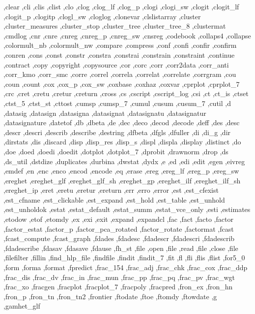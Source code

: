 {{    ,clear ,cli ,clis ,clist ,clo ,clog ,clog_lf ,clog_p ,clogi
    ,clogi_sw ,clogit ,clogit_lf ,clogit_p ,clogitp ,clogl_sw ,cloglog
    ,clonevar ,clslistarray ,cluster ,cluster_measures ,cluster_stop
    ,cluster_tree ,cluster_tree_8 ,clustermat ,cmdlog ,cnr ,cnre
    ,cnreg ,cnreg_p ,cnreg_sw ,cnsreg ,codebook ,collaps4 ,collapse
    ,colormult_nb ,colormult_nw ,compare ,compress ,conf ,confi
    ,confir ,confirm ,conren ,cons ,const ,constr ,constra ,constrai
    ,constrain ,constraint ,continue ,contract ,copy ,copyright
    ,copysource ,cor ,corc ,corr ,corr2data ,corr_anti ,corr_kmo
    ,corr_smc ,corre ,correl ,correla ,correlat ,correlate ,corrgram
    ,cou ,coun ,count ,cox ,cox_p ,cox_sw ,coxbase ,coxhaz ,coxvar
    ,cprplot ,cprplot_7 ,crc ,cret ,cretu ,cretur ,creturn ,cross ,cs
    ,cscript ,cscript_log ,csi ,ct ,ct_is ,ctset ,ctst_5 ,ctst_st
    ,cttost ,cumsp ,cumsp_7 ,cumul ,cusum ,cusum_7 ,cutil ,d ,datasig
    ,datasign ,datasigna ,datasignat ,datasignatu ,datasignatur
    ,datasignature ,datetof ,db ,dbeta ,de ,dec ,deco ,decod ,decode
    ,deff ,des ,desc ,descr ,descri ,describ ,describe ,destring
    ,dfbeta ,dfgls ,dfuller ,di ,di_g ,dir ,dirstats ,dis ,discard
    ,disp ,disp_res ,disp_s ,displ ,displa ,display ,distinct ,do
    ,doe ,doed ,doedi ,doedit ,dotplot ,dotplot_7 ,dprobit ,drawnorm
    ,drop ,ds ,ds_util ,dstdize ,duplicates ,durbina ,dwstat ,dydx ,e
    ,ed ,edi ,edit ,egen ,eivreg ,emdef ,en ,enc ,enco ,encod ,encode
    ,eq ,erase ,ereg ,ereg_lf ,ereg_p ,ereg_sw ,ereghet ,ereghet_glf
    ,ereghet_glf_sh ,ereghet_gp ,ereghet_ilf ,ereghet_ilf_sh ,ereghet_ip
    ,eret ,eretu ,eretur ,ereturn ,err ,erro ,error ,est ,est_cfexist
    ,est_cfname ,est_clickable ,est_expand ,est_hold ,est_table
    ,est_unhold ,est_unholdok ,estat ,estat_default ,estat_summ
    ,estat_vce_only ,esti ,estimates ,etodow ,etof ,etomdy ,ex ,exi
    ,exit ,expand ,expandcl ,fac ,fact ,facto ,factor ,factor_estat
    ,factor_p ,factor_pca_rotated ,factor_rotate ,factormat ,fcast
    ,fcast_compute ,fcast_graph ,fdades ,fdadesc ,fdadescr ,fdadescri
    ,fdadescrib ,fdadescribe ,fdasav ,fdasave ,fdause ,fh_st ,file
    ,open ,file ,read ,file ,close ,file ,filefilter ,fillin
    ,find_hlp_file ,findfile ,findit ,findit_7 ,fit ,fl ,fli ,flis
    ,flist ,for5_0 ,form ,forma ,format ,fpredict ,frac_154 ,frac_adj
    ,frac_chk ,frac_cox ,frac_ddp ,frac_dis ,frac_dv ,frac_in ,frac_mun
    ,frac_pp ,frac_pq ,frac_pv ,frac_wgt ,frac_xo ,fracgen ,fracplot
    ,fracplot_7 ,fracpoly ,fracpred ,fron_ex ,fron_hn ,fron_p ,fron_tn
    ,fron_tn2 ,frontier ,ftodate ,ftoe ,ftomdy ,ftowdate ,g ,gamhet_glf
}}
